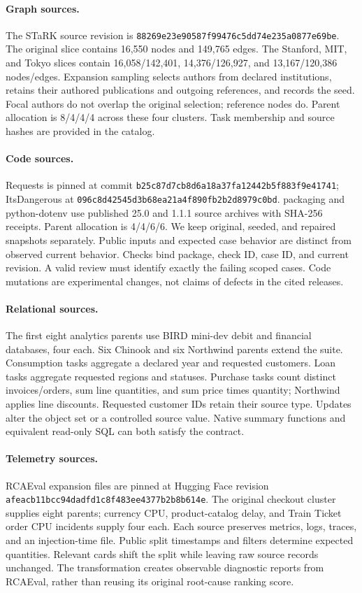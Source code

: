 \paragraph{Graph sources.}
The STaRK source revision is \nolinkurl{88269e23e90587f99476c5dd74e235a0877e69be}. The original slice contains 16,550 nodes and 149,765 edges. The Stanford, MIT, and Tokyo slices contain 16,058/142,401, 14,376/126,927, and 13,167/120,386 nodes/edges. Expansion sampling selects authors from declared institutions, retains their authored publications and outgoing references, and records the seed. Focal authors do not overlap the original selection; reference nodes do. Parent allocation is 8/4/4/4 across these four clusters. Task membership and source hashes are provided in the catalog.

\paragraph{Code sources.}
Requests is pinned at commit \nolinkurl{b25c87d7cb8d6a18a37fa12442b5f883f9e41741}; ItsDangerous at \nolinkurl{096c8d42545d3b68ea21a4f890fb2b2d8979c0bd}. packaging and python-dotenv use published 25.0 and 1.1.1 source archives with SHA-256 receipts. Parent allocation is 4/4/6/6. We keep original, seeded, and repaired snapshots separately. Public inputs and expected case behavior are distinct from observed current behavior. Checks bind package, check ID, case ID, and current revision. A valid review must identify exactly the failing scoped cases. Code mutations are experimental changes, not claims of defects in the cited releases.

\paragraph{Relational sources.}
The first eight analytics parents use BIRD mini-dev debit and financial databases, four each. Six Chinook and six Northwind parents extend the suite. Consumption tasks aggregate a declared year and requested customers. Loan tasks aggregate requested regions and statuses. Purchase tasks count distinct invoices/orders, sum line quantities, and sum price times quantity; Northwind applies line discounts. Requested customer IDs retain their source type. Updates alter the object set or a controlled source value. Native summary functions and equivalent read-only SQL can both satisfy the contract.

\paragraph{Telemetry sources.}
RCAEval expansion files are pinned at Hugging Face revision \nolinkurl{afeacb11bcc94dadfd1c8f483ee4377b2b8b614e}. The original checkout cluster supplies eight parents; currency CPU, product-catalog delay, and Train Ticket order CPU incidents supply four each. Each source preserves metrics, logs, traces, and an injection-time file. Public split timestamps and filters determine expected quantities. Relevant cards shift the split while leaving raw source records unchanged. The transformation creates observable diagnostic reports from RCAEval, rather than reusing its original root-cause ranking score.

